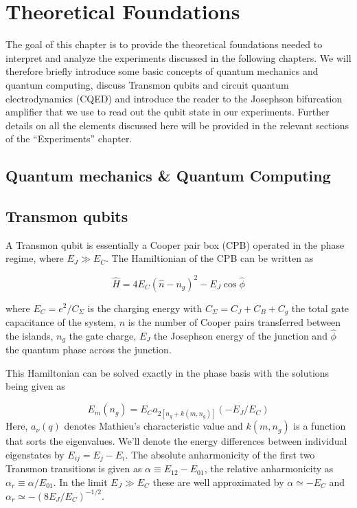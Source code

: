\chapter{Theoretical Foundations}

The goal of this chapter is to provide the theoretical foundations needed to interpret and analyze the experiments discussed in the following chapters. We will therefore briefly introduce some basic concepts of quantum mechanics and quantum computing, discuss Transmon qubits and circuit quantum electrodynamics (CQED) and introduce the reader to the Josephson bifurcation amplifier that we use to read out the qubit state in our experiments. Further details on all the elements discussed here will be provided in the relevant sections of the ``Experiments'' chapter.

\section{Quantum mechanics \& Quantum Computing}

\section{Transmon qubits}

A Transmon qubit is essentially a Cooper pair box (CPB) operated in the phase regime, where $E_J \gg E_C$. The Hamiltionian of the CPB can be written as \citep{cottet_implementation_2002}

\begin{equation}
\hat{H} = 4 E_C \left( \hat{n} - n_g\right)^2-E_J \cos{\hat{\phi}}
\end{equation}

where $E_C = e^2 / C_\Sigma$ is the charging energy with $C_\Sigma = C_J+C_B+C_g$ the total gate capacitance of the system, $\hat{n}$ is the number of Cooper pairs transferred between the islands, $n_g$ the gate charge, $E_J$ the Josephson energy of the junction and $\hat{\phi}$ the quantum phase across the junction.

This Hamiltonian can be solved exactly in the phase basis with the solutions being given as\citep{koch_charge-insensitive_2007,cottet_implementation_2002}

\begin{equation}
E_m(n_g) = E_C a_{2[n_g+k(m,n_g)]}(-E_J/E_C)
\end{equation}
Here, $a_\nu(q)$ denotes  Mathieu's characteristic value and $k(m,n_g)$ is a function that sorts the eigenvalues. We'll denote the energy differences between individual eigenstates by $E_{ij} = E_j - E_i$. The absolute anharmonicity of the first two Transmon transitions is given as $\alpha \equiv E_{12}-E_{01}$, the relative anharmonicity as $\alpha_r \equiv \alpha / E_{01}$. In the limit $E_J \gg E_C$ these are well approximated by $\alpha \simeq -E_C$ and $\alpha_r \simeq -(8E_J / E_C)^{-1/2}$.

